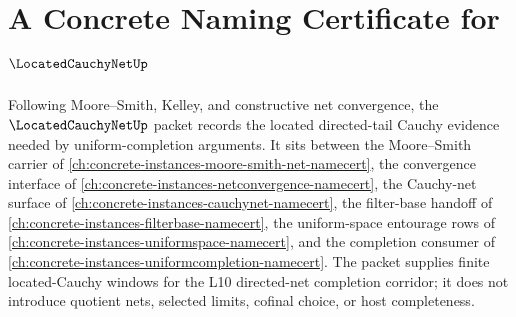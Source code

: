 \chapter{A Concrete Naming Certificate for $\LocatedCauchyNetUp$}
\label{ch:concrete-instances-located-cauchy-net-namecert}

Following Moore--Smith, Kelley, and constructive net convergence, the $\LocatedCauchyNetUp$ packet records the located directed-tail Cauchy evidence needed by uniform-completion arguments. It sits between the Moore--Smith carrier of \autoref{ch:concrete-instances-moore-smith-net-namecert}, the convergence interface of \autoref{ch:concrete-instances-netconvergence-namecert}, the Cauchy-net surface of \autoref{ch:concrete-instances-cauchynet-namecert}, the filter-base handoff of \autoref{ch:concrete-instances-filterbase-namecert}, the uniform-space entourage rows of \autoref{ch:concrete-instances-uniformspace-namecert}, and the completion consumer of \autoref{ch:concrete-instances-uniformcompletion-namecert}. The packet supplies finite located-Cauchy windows for the L10 directed-net completion corridor; it does not introduce quotient nets, selected limits, cofinal choice, or host completeness.

